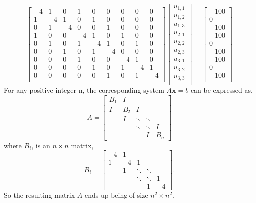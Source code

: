 \begin{problem}
$$
\begin{bmatrix}
-4 & 1  &  0 &  1 &  0 &  0 &  0 &  0 & 0 \\
 1 & -4 &  1 &  0 &  1 &  0 &  0 &  0 & 0 \\
 0 & 1  & -4 &  0 &  0 &  1 &  0 &  0 & 0 \\
 1 & 0  &  0 & -4 &  1 &  0 &  1 &  0 & 0 \\
 0 & 1  &  0 &  1 & -4 &  1 &  0 &  1 & 0 \\
 0 & 0  &  1 &  0 &  1 & -4 &  0 &  0 & 0 \\
 0 & 0  &  0 &  1 &  0 &  0 & -4 &  1 & 0 \\
 0 & 0  &  0 &  0 &  1 &  0 &  1 & -4 & 1 \\
 0 & 0  &  0 &  0 &  0 &  1 &  0 &  1 & -4 \\
\end{bmatrix}
\begin{bmatrix}
u_{1,1} \\
u_{1,2} \\
u_{1,3} \\
u_{2,1} \\
u_{2,2} \\
u_{2,3} \\
u_{3,1} \\
u_{3,2} \\
u_{3,3} \\
\end{bmatrix}
=
\begin{bmatrix}
-100 \\
 0  \\
-100 \\
-100 \\
 0  \\
-100 \\
-100 \\
 0  \\
-100 \\
\end{bmatrix}
$$
For any positive integer n, the corresponding system $A \mathbf{x} = b$ can be expressed as,
$$
A = \begin{bmatrix}
B_1 & I &      &        & \\
I & B_2 &  I   &        & \\
  & I & \ddots & \ddots & \\
  &   & \ddots & \ddots & I \\
  &   &        &    I   & B_n
\end{bmatrix}
$$
where $B_i$, is an $n \times n$ matrix,
$$
B_i = \begin{bmatrix}
-4 &  1 &      &        & \\
 1 & -4 &  1   &        & \\
   &  1 & \ddots & \ddots & \\
   &    & \ddots & \ddots & 1 \\
   &    &        &    1   & -4
\end{bmatrix}.
$$
So the resulting matrix $A$ ends up being of size $n^2 \times n^2$.


\end{problem}
